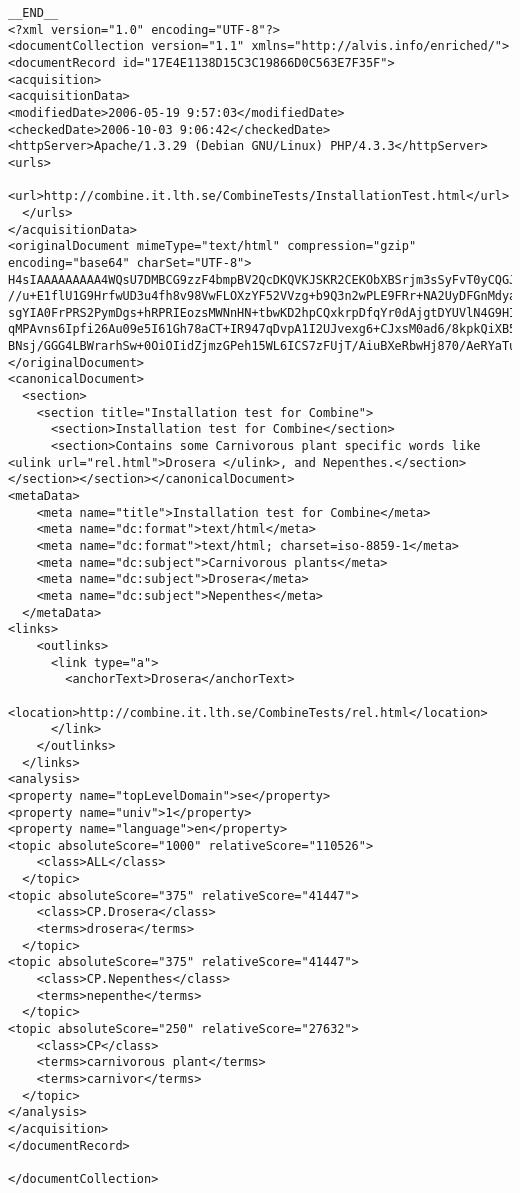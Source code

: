 \begin{verbatim}
__END__
<?xml version="1.0" encoding="UTF-8"?>
<documentCollection version="1.1" xmlns="http://alvis.info/enriched/">
<documentRecord id="17E4E1138D15C3C19866D0C563E7F35F">
<acquisition>
<acquisitionData>
<modifiedDate>2006-05-19 9:57:03</modifiedDate>
<checkedDate>2006-10-03 9:06:42</checkedDate>
<httpServer>Apache/1.3.29 (Debian GNU/Linux) PHP/4.3.3</httpServer>
<urls>
    <url>http://combine.it.lth.se/CombineTests/InstallationTest.html</url>
  </urls>
</acquisitionData>
<originalDocument mimeType="text/html" compression="gzip" encoding="base64" charSet="UTF-8">
H4sIAAAAAAAAA4WQsU7DMBCG9zzF4bmpBV2QcDKQVKJSKR2CEKObXBSrjm3sSyFvT0yCQGJgusG/
//u+E1flU1G9HrfwUD3u4fh8v98VwFLOXzYF52VVzg+b9Q3n2wPLE9FRr+NA2UyDFGnMdyaQ1FqS
sgYIA0FrPRS2PymDgs+hRPRIEozsMWNnHN+tbwKD2hpCQxkrpDfqYr0dAjgtDYUVlN4G9HIFB3RT
qMPAvns6Ipfi26Au09e5I61Gh78aCT+IR947qDvpA1I2UJvexg6+CJxsM0ad6/8kpkQiXB5XSWUC
BNsj/GGG4LBWrarhSw+0OiOIidZjmzGPeh15WL6ICS7zFUjT/AiuBXeRbwHj870/AeRYaTupAQAA
</originalDocument>
<canonicalDocument>  
  <section>
    <section title="Installation test for Combine">
      <section>Installation test for Combine</section> 
      <section>Contains some Carnivorous plant specific words like <ulink url="rel.html">Drosera </ulink>, and Nepenthes.</section></section></section></canonicalDocument>
<metaData>
    <meta name="title">Installation test for Combine</meta>
    <meta name="dc:format">text/html</meta>
    <meta name="dc:format">text/html; charset=iso-8859-1</meta>
    <meta name="dc:subject">Carnivorous plants</meta>
    <meta name="dc:subject">Drosera</meta>
    <meta name="dc:subject">Nepenthes</meta>
  </metaData>
<links>
    <outlinks>
      <link type="a">
        <anchorText>Drosera</anchorText>
        <location>http://combine.it.lth.se/CombineTests/rel.html</location>
      </link>
    </outlinks>
  </links>
<analysis>
<property name="topLevelDomain">se</property>
<property name="univ">1</property>
<property name="language">en</property>
<topic absoluteScore="1000" relativeScore="110526">
    <class>ALL</class>
  </topic>
<topic absoluteScore="375" relativeScore="41447">
    <class>CP.Drosera</class>
    <terms>drosera</terms>
  </topic>
<topic absoluteScore="375" relativeScore="41447">
    <class>CP.Nepenthes</class>
    <terms>nepenthe</terms>
  </topic>
<topic absoluteScore="250" relativeScore="27632">
    <class>CP</class>
    <terms>carnivorous plant</terms>
    <terms>carnivor</terms>
  </topic>
</analysis>
</acquisition>
</documentRecord>

</documentCollection>
\end{verbatim}
